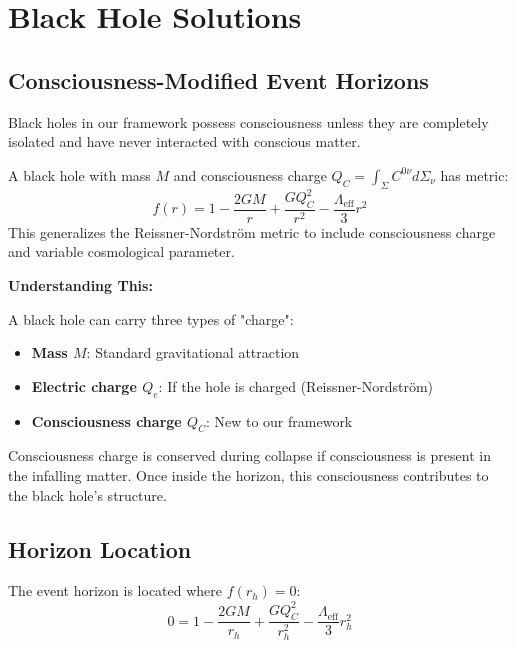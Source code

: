 \section{Black Hole Solutions}

\subsection{Consciousness-Modified Event Horizons}

Black holes in our framework possess consciousness unless they are completely isolated and have never interacted with conscious matter.

\begin{theorem}\label{thm:consciousness-black-hole}
A black hole with mass $M$ and consciousness charge $Q_C = \int_{\Sigma} C^{0\nu} d\Sigma_\nu$ has metric:
\begin{equation}
\boxed{f(r) = 1 - \frac{2GM}{r} + \frac{G Q_C^2}{r^2} - \frac{\Lambda_{\text{eff}}}{3} r^2}
\end{equation}
This generalizes the Reissner-Nordström metric\cite{reissner1916,nordstrom1918} to include consciousness charge and variable cosmological parameter.
\end{theorem}

\begin{level1}
\textbf{Understanding This:}

A black hole can carry three types of "charge":
\begin{itemize}
\item \textbf{Mass $M$}: Standard gravitational attraction
\item \textbf{Electric charge $Q_e$}: If the hole is charged (Reissner-Nordström\cite{reissner1916,nordstrom1918})
\item \textbf{Consciousness charge $Q_C$}: New to our framework
\end{itemize}

Consciousness charge is conserved during collapse if consciousness is present in the infalling matter. Once inside the horizon, this consciousness contributes to the black hole's structure.
\end{level1}

\subsection{Horizon Location}

The event horizon is located where $f(r_h) = 0$:
\begin{equation}
0 = 1 - \frac{2GM}{r_h} + \frac{G Q_C^2}{r_h^2} - \frac{\Lambda_{\text{eff}}}{3} r_h^2
\end{equation}

